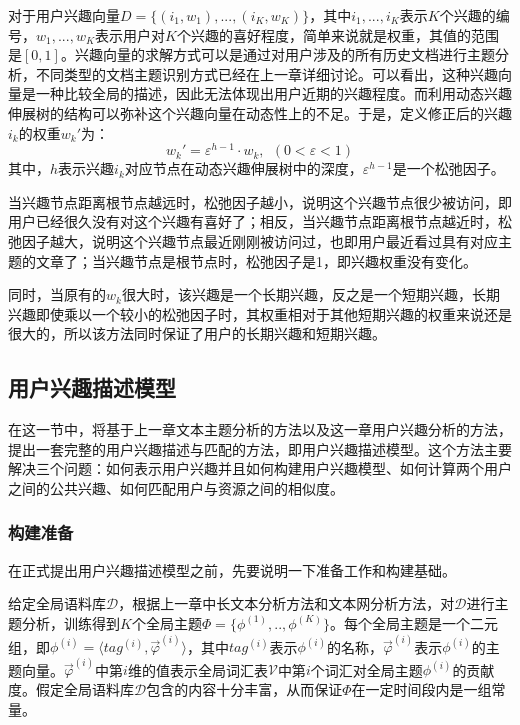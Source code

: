 对于用户兴趣向量$D=\{(i_1,w_1),...,(i_K,w_K)\}$，其中$i_1,...,i_K$表示$K$个兴趣的编号，$w_1,...,w_K$表示用户对$K$个兴趣的喜好程度，简单来说就是权重，其值的范围是$[0,1]$。兴趣向量的求解方式可以是通过对用户涉及的所有历史文档进行主题分析，不同类型的文档主题识别方式已经在上一章详细讨论。可以看出，这种兴趣向量是一种比较全局的描述，因此无法体现出用户近期的兴趣程度。而利用动态兴趣伸展树的结构可以弥补这个兴趣向量在动态性上的不足。于是，定义修正后的兴趣$i_k$的权重$w_k'$为：
\begin{equation}
  w_k'=\varepsilon^{h-1}\cdot w_k,~~(0<\varepsilon<1)
\end{equation}
其中，$h$表示兴趣$i_k$对应节点在动态兴趣伸展树中的深度，$\varepsilon^{h-1}$是一个松弛因子。

当兴趣节点距离根节点越远时，松弛因子越小，说明这个兴趣节点很少被访问，即用户已经很久没有对这个兴趣有喜好了；相反，当兴趣节点距离根节点越近时，松弛因子越大，说明这个兴趣节点最近刚刚被访问过，也即用户最近看过具有对应主题的文章了；当兴趣节点是根节点时，松弛因子是1，即兴趣权重没有变化。

同时，当原有的$w_k$很大时，该兴趣是一个长期兴趣，反之是一个短期兴趣，长期兴趣即使乘以一个较小的松弛因子时，其权重相对于其他短期兴趣的权重来说还是很大的，所以该方法同时保证了用户的长期兴趣和短期兴趣。

\subsection{用户兴趣描述模型}
在这一节中，将基于上一章文本主题分析的方法以及这一章用户兴趣分析的方法，提出一套完整的用户兴趣描述与匹配的方法，即用户兴趣描述模型。这个方法主要解决三个问题：如何表示用户兴趣并且如何构建用户兴趣模型、如何计算两个用户之间的公共兴趣、如何匹配用户与资源之间的相似度。

\subsubsection{构建准备}
在正式提出用户兴趣描述模型之前，先要说明一下准备工作和构建基础。

给定全局语料库$\mathcal{D}$，根据上一章中长文本分析方法和文本网分析方法，对$\mathcal{D}$进行主题分析，训练得到$K$个全局主题$\Phi=\{\phi^{(1)},..,\phi^{(K)}\}$。每个全局主题是一个二元组，即$\phi^{(i)}=\langle tag^{(i)},\vec{\varphi}^{(i)}\rangle$，其中$tag^{(i)}$表示$\phi^{(i)}$的名称，$\vec{\varphi}^{(i)}$表示$\phi^{(i)}$的主题向量。$\vec{\varphi}^{(i)}$中第$i$维的值表示全局词汇表$\mathcal{V}$中第$i$个词汇对全局主题$\phi^{(i)}$的贡献度。假定全局语料库$\mathcal{D}$包含的内容十分丰富，从而保证$\Phi$在一定时间段内是一组常量。

